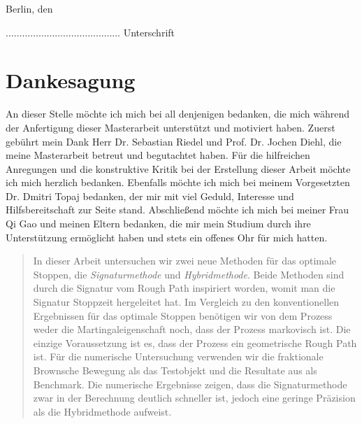 \documentclass[12pt,titlepage,headsepline]{article}
\begin{document}
    \vspace{0.5cm}
    \hfill\break
    Berlin, den

    \vspace{1cm}
    \hfill\break
    $\ldots\ldots\ldots\ldots\ldots\ldots\ldots\ldots\ldots\ldots\ldots\ldots\ldots\ldots$
    \hfill\break
    Unterschrift
    \newpage

    \section*{Dankesagung}
    \thispagestyle{empty}
    An dieser Stelle möchte ich mich bei all denjenigen bedanken, die mich während der Anfertigung dieser Masterarbeit unterstützt und motiviert haben.
    \hfill\break
    Zuerst gebührt mein Dank Herr Dr. Sebastian Riedel und Prof. Dr. Jochen Diehl, die meine Masterarbeit betreut und begutachtet haben. Für die hilfreichen Anregungen und die konstruktive Kritik bei der Erstellung dieser Arbeit möchte ich mich herzlich bedanken.
    \hfill\break
    Ebenfalls möchte ich mich bei meinem Vorgesetzten Dr. Dmitri Topaj bedanken, der mir mit viel Geduld, Interesse und Hilfsbereitschaft zur Seite stand.
    \hfill\break
    Abschließend möchte ich mich bei meiner Frau Qi Gao und meinen Eltern bedanken, die mir mein Studium durch ihre Unterstützung ermöglicht haben und stets ein offenes Ohr für mich hatten.

    \newpage

    \begin{otherlanguage}{english}
      \begin{abstract}
        In dieser Arbeit untersuchen wir zwei neue Methoden für das optimale Stoppen, die \textit{Signaturmethode} und \textit{Hybridmethode}. Beide Methoden sind durch die Signatur vom Rough Path inspiriert worden, womit man die Signatur Stoppzeit hergeleitet hat. Im Vergleich zu den konventionellen Ergebnissen für das optimale Stoppen benötigen wir von dem Prozess weder die Martingaleigenschaft noch, dass der Prozess markovisch ist. Die einzige Voraussetzung ist es, dass der Prozess ein geometrische Rough Path ist. Für die numerische Untersuchung verwenden wir die fraktionale Brownsche Bewegung als das Testobjekt und die Resultate aus \cite{becker_deep_2019} als Benchmark. Die numerische Ergebnisse zeigen, dass die Signaturmethode zwar in der Berechnung deutlich schneller ist, jedoch eine geringe Präzision als die Hybridmethode aufweist.
      \end{abstract}
    \end{otherlanguage}
    \newpage
\end{document}
